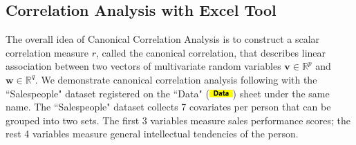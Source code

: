 \documentclass[article]{jss}
\numberwithin{equation}{subsection}
\newcommand{\shtData}{``Data" (\includegraphics[height=8pt, keepaspectratio=true]{DataSheetTab_png}) }
\begin{document}
        \subsection[egCCA]{Correlation Analysis with Excel Tool}
        The overall idea of Canonical Correlation Analysis \citep{hotelling1936relations} is to construct a scalar correlation measure $r$, called the canonical correlation, that describes linear association between two vectors of multivariate random variables $\textbf{v}\in\mathbb{R}^p$ and $\textbf{w}\in\mathbb{R}^q$. We demonstrate canonical correlation analysis following \cite{anderson2003introMVA3e} with the ``Salespeople" dataset registered on the \shtData sheet under the same name. The ``Salespeople" dataset collects 7 covariates per person that can be grouped into two sets. The first 3 variables measure sales performance scores; the rest 4 variables measure general intellectual tendencies of the person.
        
\end{document}
